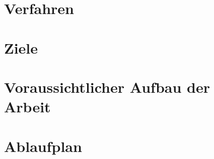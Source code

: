 \documentclass[a4paper,DIV10,12pt,headsepline,smallheadings]{scrreprt}
\begin{document}
\section{Verfahren}


\section{Ziele}
\section{Voraussichtlicher Aufbau der Arbeit}
\section{Ablaufplan}
\end{document}

